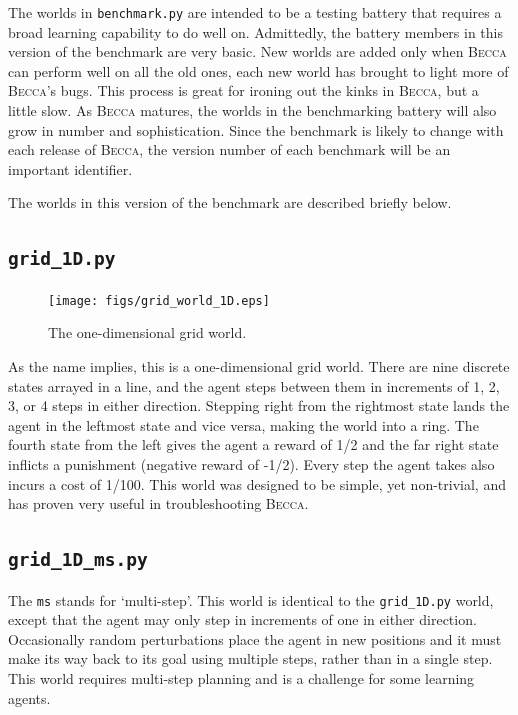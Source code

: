 The worlds in \texttt{benchmark.py} are intended to be a testing battery that requires a broad learning capability to do well on. Admittedly, the battery members in this version of the benchmark are very basic. New worlds are added only when \textsc{Becca} can perform well on all the old ones, each new world has brought to light more of \textsc{Becca}'s bugs. This process is great for ironing out the kinks in \textsc{Becca}, but a little slow. As \textsc{Becca} matures, the worlds in the benchmarking battery will also grow in number and sophistication. Since the benchmark is likely to change with each release of \textsc{Becca}, the version number of each benchmark will be an important identifier.

The worlds in this version of the benchmark are described briefly below.

\subsection{\texttt{grid\_1D.py}}

\begin{figure}
\centering
\texttt{[image: figs/grid\_world\_1D.eps]}
\caption{The one-dimensional grid world.}
\label{grid_1D}
\end{figure}

As the name implies, this is a one-dimensional grid world. There are nine discrete states arrayed in a line, and the agent steps between them in increments of 1, 2, 3, or 4 steps in either direction. Stepping right from the rightmost state lands the agent in the leftmost state and vice versa, making the world into a ring. The fourth state from the left gives the agent a reward of 1/2 and the far right state inflicts a punishment (negative reward of -1/2). Every step the agent takes also incurs a cost of  1/100. This world was designed to be simple, yet non-trivial, and has proven very useful in troubleshooting \textsc{Becca}.

\subsection{\texttt{grid\_1D\_ms.py}}

The \texttt{ms} stands for `multi-step'. This world is identical to the \texttt{grid\_1D.py} world, except that the agent may only step in increments of one in either direction. Occasionally random perturbations place the agent in new positions and it must make its way back to its goal using multiple steps, rather than in a single step. This world requires multi-step planning and is a challenge for some learning agents.


